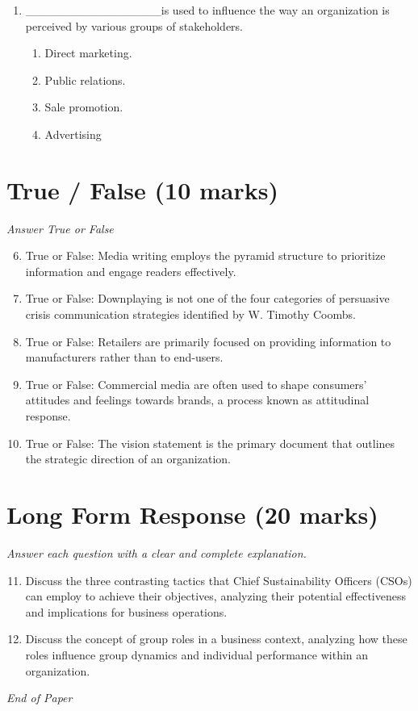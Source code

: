 \documentclass[12pt]{article}
\begin{document}
\begin{enumerate}[label=\arabic*.]
\begin{enumerate}[label=(\alph*)]
    \item Guiding, demonstrating and motivating
    \item Guiding, mentoring and demonstrating
\end{enumerate}
\item \_\_\_\_\_\_\_\_\_\_\_\_\_\_\_\_is used to influence the way an organization is perceived by various groups of stakeholders.
\begin{enumerate}[label=(\alph*)]
    \item Direct marketing.
    \item Public relations.
    \item Sale promotion.
    \item Advertising
\end{enumerate}
\end{enumerate}

\section*{True / False (10 marks)}
\textit{Answer True or False}
\begin{enumerate}[label=\arabic*.]
\setcounter{enumi}{5}
\item True or False: Media writing employs the pyramid structure to prioritize information and engage readers effectively.
\item True or False: Downplaying is not one of the four categories of persuasive crisis communication strategies identified by W. Timothy Coombs.
\item True or False: Retailers are primarily focused on providing information to manufacturers rather than to end-users.
\item True or False: Commercial media are often used to shape consumers' attitudes and feelings towards brands, a process known as attitudinal response.
\item True or False: The vision statement is the primary document that outlines the strategic direction of an organization.
\end{enumerate}

\section*{Long Form Response (20 marks)}
\textit{Answer each question with a clear and complete explanation.}
\begin{enumerate}[label=\arabic*.]
\setcounter{enumi}{10}
\item Discuss the three contrasting tactics that Chief Sustainability Officers (CSOs) can employ to achieve their objectives, analyzing their potential effectiveness and implications for business operations.
\item Discuss the concept of group roles in a business context, analyzing how these roles influence group dynamics and individual performance within an organization.
\end{enumerate}

\vfill
\noindent\textit{End of Paper}
\end{document}
